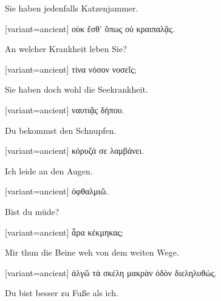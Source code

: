 Sie haben jedenfalls Katzenjammer.

\switchcolumn

\begin{greek}[variant=ancient]%
οὐκ ἔσθ' ὅπως οὐ κραιπαλᾷς.

\end{greek}%
\switchcolumn*

An welcher Krankheit leben Sie?

\switchcolumn

\begin{greek}[variant=ancient]%
τίνα νόσον νοσεῖς;

\end{greek}%
\switchcolumn*

Sie haben doch wohl die Seekrankheit.

\switchcolumn

\begin{greek}[variant=ancient]%
ναυτιᾷς δήπου.

\end{greek}%
\switchcolumn*

Du bekommst den Schnupfen.

\switchcolumn

\begin{greek}[variant=ancient]%
κόρυζά σε λαμβάνει.

\end{greek}%
\switchcolumn*

Ich leide an den Augen.

\switchcolumn

\begin{greek}[variant=ancient]%
ὀφθαλμιῶ.

\end{greek}%
\switchcolumn*

Bist du müde?

\switchcolumn

\begin{greek}[variant=ancient]%
ἆρα κέκμηκας;

\end{greek}%
\switchcolumn*

Mir thun die Beine weh von dem weiten Wege.

\switchcolumn

\begin{greek}[variant=ancient]%
ἀλγῶ τὰ σκέλη μακρὰν ὁδὸν διεληλυθώς.

\end{greek}%
\switchcolumn*

Du bist besser zu Fuße als ich.


